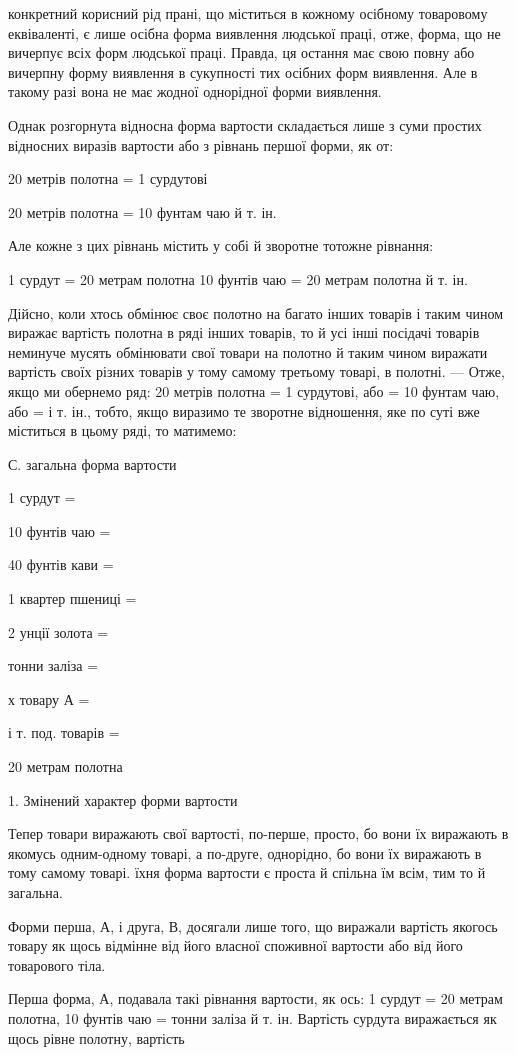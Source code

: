 конкретний корисний рід прані, що міститься в кожному осібному
товаровому еквіваленті, є лише осібна форма виявлення людської
праці, отже, форма, що не вичерпує всіх форм людської праці.
Правда, ця остання має свою повну або вичерпну форму виявлення
в сукупності тих осібних форм виявлення. Але в такому разі вона
не має жодної однорідної форми виявлення.

Однак розгорнута відносна форма вартости складається лише
з суми простих відносних виразів вартости або з рівнань першої
форми, як от:

20 метрів полотна = 1 сурдутові

20 метрів полотна = 10 фунтам чаю й т. ін.

Але кожне з цих рівнань містить у собі й зворотне тотожне
рівнання:

1 сурдут = 20 метрам полотна
10 фунтів чаю = 20 метрам полотна й т. ін.

Дійсно, коли хтось обмінює своє полотно на багато інших товарів
і таким чином виражає вартість полотна в ряді інших товарів,
то й усі інші посідачі товарів неминуче мусять обмінювати
свої товари на полотно й таким чином виражати вартість своїх
різних товарів у тому самому третьому товарі, в полотні. — Отже,
якщо ми обернемо ряд: 20 метрів полотна = 1 сурдутові, або =
10 фунтам чаю, або = і т. ін., тобто, якщо виразимо те зворотне
відношення, яке по суті вже міститься в цьому ряді, то матимемо:

С. загальна форма вартости

1 сурдут =

10 фунтів чаю =

40 фунтів кави =

1    квартер пшениці =

2    унції золота =

 тонни заліза =

х товару А =

і т. под. товарів =

20 метрам полотна

1. Змінений характер форми вартости

Тепер товари виражають свої вартості, по-перше, просто, бо
вони їх виражають в якомусь одним-одному товарі, а по-друге,
однорідно, бо вони їх виражають в тому самому товарі. їхня форма
вартости є проста й спільна їм всім, тим то й загальна.

Форми перша, А, і друга, В, досягали лише того, що виражали
вартість якогось товару як щось відмінне від його власної
споживної вартости або від його товарового тіла.

Перша форма, А, подавала такі рівнання вартости, як ось: 1 сурдут
= 20 метрам полотна, 10 фунтів чаю =  тонни заліза й т. ін.
Вартість сурдута виражається як щось рівне полотну, вартість
